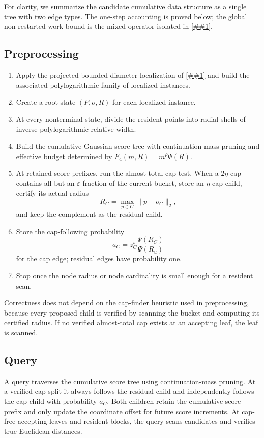 \documentclass[10pt]{article}
\newcommand{\cref}[1]{\ref{##1}}
\theoremstyle{definition}
\begin{document}
For clarity, we summarize the candidate cumulative data structure as a single tree with two edge types. The one-step accounting is proved below; the global non-restarted work bound is the mixed operator isolated in \cref{asm:mixed-continuation-operator}.

\subsection{Preprocessing}

\begin{enumerate}
   \item Apply the projected bounded-diameter localization of \cref{lem:localization} and build the associated polylogarithmic family of localized instances.
   \item Create a root state $(P,o,R)$ for each localized instance.
   \item At every nonterminal state, divide the resident points into radial shells of inverse-polylogarithmic relative width.
   \item Build the cumulative Gaussian score tree with continuation-mass pruning and effective budget determined by $F_4(m,R)=m^\rho\Psi(R)$.
   \item At retained score prefixes, run the almost-total cap test. When a $2\eta$-cap contains all but an $\varepsilon$ fraction of the current bucket, store an $\eta$-cap child, certify its actual radius
      \[
         R_C=\max_{p\in C}\|p-o_C\|_2,
      \]
      and keep the complement as the residual child.
   \item Store the cap-following probability
      \[
         a_C=z_C^s\frac{\Psi(R_C)}{\Psi(R_u)}
      \]
      for the cap edge; residual edges have probability one.
   \item Stop once the node radius or node cardinality is small enough for a resident scan.
\end{enumerate}

Correctness does not depend on the cap-finder heuristic used in preprocessing, because every proposed child is verified by scanning the bucket and computing its certified radius. If no verified almost-total cap exists at an accepting leaf, the leaf is scanned.

\subsection{Query}

A query traverses the cumulative score tree using continuation-mass pruning. At a verified cap split it always follows the residual child and independently follows the cap child with probability $a_C$. Both children retain the cumulative score prefix and only update the coordinate offset for future score increments. At cap-free accepting leaves and resident blocks, the query scans candidates and verifies true Euclidean distances.
\end{document}
